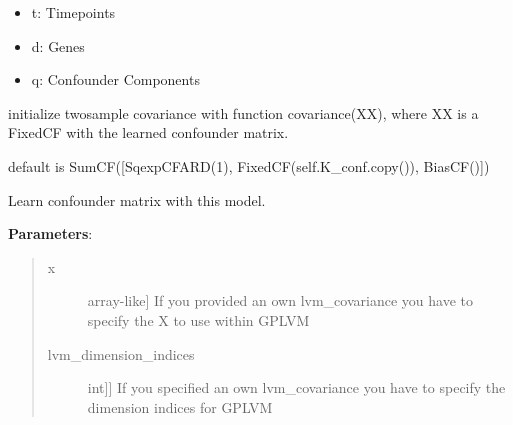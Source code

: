 \documentclass[letterpaper,10pt]{sphinxmanual}
\begin{document}
\begin{fulllineitems}
\begin{description}
\begin{itemize}
\item {} 
t: Timepoints

\item {} 
d: Genes

\item {} 
q: Confounder Components

\end{itemize}

\end{description}

\begin{fulllineitems}
\label{base:gptwosample.confounder.confounder.TwoSampleConfounder.initialize_twosample_covariance}
initialize twosample covariance with function covariance(XX), where XX
is a FixedCF with the learned confounder matrix.

default is SumCF({[}SqexpCFARD(1), FixedCF(self.K\_conf.copy()), BiasCF(){]})

\end{fulllineitems}


\begin{fulllineitems}
\label{base:gptwosample.confounder.confounder.TwoSampleConfounder.learn_confounder_matrix}
Learn confounder matrix with this model.

\textbf{Parameters}:
\begin{quote}
\begin{description}
\item[{x}] \leavevmode{[}array-like{]}
If you provided an own lvm\_covariance you have to specify
the X to use within GPLVM

\item[{lvm\_dimension\_indices}] \leavevmode{[}{[}int{]}{]}
If you specified an own lvm\_covariance you have to specify
the dimension indices for GPLVM


\end{description}
\end{quote}
\end{fulllineitems}
\end{fulllineitems}
\end{document}
